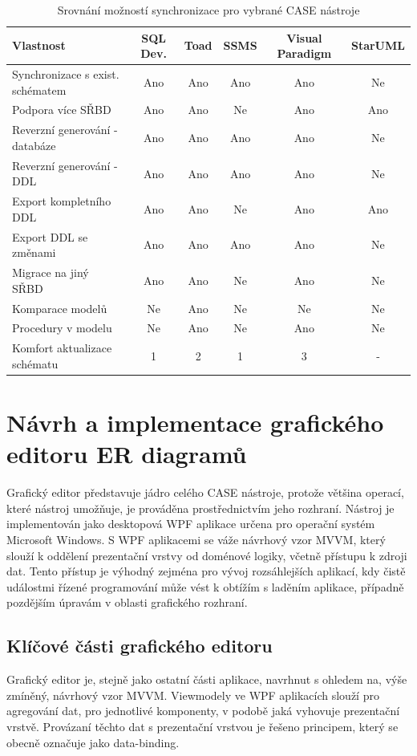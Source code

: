\documentclass[czech,bachelor,public,dept460,male,oneside]{diploma}
\begin{document}
	\begin{table}[!h]
		\centering
		\caption{Srovnání možností synchronizace pro vybrané CASE nástroje}
		\label{tab:ddlCreateCmp}
		\begin{tabular}{l c c c c c}
			\toprule
			Vlastnost & SQL Dev. & Toad & SSMS & Visual Paradigm & StarUML \\
			\midrule
			Synchronizace s exist. schématem & Ano & Ano & Ano & Ano & Ne \\
			Podpora více SŘBD & Ano & Ano & Ne & Ano & Ano \\
			Reverzní generování - databáze & Ano & Ano & Ano & Ano & Ne \\
			Reverzní generování - DDL & Ano & Ano & Ano & Ano & Ne  \\
			Export kompletního DDL & Ano & Ano & Ne & Ano & Ano \\
			Export DDL se změnami & Ano & Ano & Ano & Ano & Ne \\
			Migrace na jiný SŘBD & Ano & Ano & Ne & Ano & Ne \\
			Komparace modelů & Ne & Ano & Ne & Ne & Ne \\
			Procedury v modelu & Ne & Ano & Ne & Ano & Ne \\
			Komfort aktualizace schématu & 1 & 2 & 1 & 3 & - \\
			\midrule
		\end{tabular}
	\end{table}
	
\newpage
\section{Návrh a implementace grafického editoru ER diagramů}
Grafický editor představuje jádro celého CASE nástroje, protože většina operací, které nástroj umožňuje, je prováděna prostřednictvím jeho rozhraní. Nástroj je implementován jako desktopová WPF aplikace určena pro operační systém Microsoft Windows. S WPF aplikacemi se váže návrhový vzor MVVM, který slouží k oddělení prezentační vrstvy od doménové logiky, včetně přístupu k zdroji dat. Tento přístup je výhodný zejména pro vývoj rozsáhlejších aplikací, kdy čistě událostmi řízené programování může vést k obtížím s laděním aplikace, případně pozdějším úpravám v oblasti grafického rozhraní.
	
	\subsection{Klíčové části grafického editoru}
	Grafický editor je, stejně jako ostatní části aplikace, navrhnut s ohledem na, výše zmíněný, návrhový vzor MVVM. Viewmodely ve WPF aplikacích slouží pro agregování dat, pro jednotlivé komponenty, v podobě jaká vyhovuje prezentační vrstvě. Provázaní těchto dat s prezentační vrstvou je řešeno principem, který se obecně označuje jako data-binding. 
	
\end{document}

